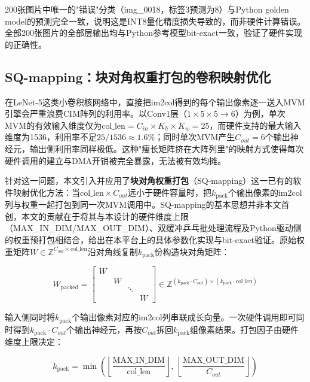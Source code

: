 \documentclass[12pt, a4paper]{article}
\begin{document}
200张图片中唯一的"错误"分类（img\_0018，标签3预测为8）与Python golden model的预测完全一致，说明这是INT8量化精度损失导致的，而非硬件计算错误。全部200张图片的全部层输出均与Python参考模型bit-exact一致，验证了硬件实现的正确性。


\subsection{SQ-mapping：块对角权重打包的卷积映射优化}
\label{sec:sqmapping}

在LeNet-5这类小卷积核网络中，直接把im2col得到的每个输出像素逐一送入MVM引擎会严重浪费CIM阵列的利用率。以Conv1层（$1\times5\times5\to6$）为例，单次MVM的有效输入维度仅为$\text{col\_len} = C_{in}\times K_h\times K_w = 25$，而硬件支持的最大输入维度为1536，利用率不足$25/1536\approx 1.6\%$；同时单次MVM产生$C_{out}=6$个输出神经元，输出侧利用率同样极低。这种"瘦长矩阵挤在大阵列里"的映射方式使得每次硬件调用的建立与DMA开销被完全暴露，无法被有效均摊。

针对这一问题，本文引入并应用了\textbf{块对角权重打包}（SQ-mapping）这一已有的软件映射优化方法：当$\text{col\_len}\times C_{out}$远小于硬件容量时，把$k_{\text{pack}}$个输出像素的im2col列与权重一起打包到同一次MVM调用中。SQ-mapping的基本思想并非本文首创，本文的贡献在于将其与本设计的硬件维度上限（MAX\_IN\_DIM/MAX\_OUT\_DIM）、双缓冲乒乓批处理流程及Python驱动侧的权重预打包相结合，给出在本平台上的具体参数化实现与bit-exact验证。原始权重矩阵$W\in\mathbb{Z}^{C_{out}\times \text{col\_len}}$沿对角线复制$k_{\text{pack}}$份构造块对角矩阵：

\begin{equation}
	W_{\text{packed}} = \begin{bmatrix}
		W & & & \\
		& W & & \\
		& & \ddots & \\
		& & & W
	\end{bmatrix} \in \mathbb{Z}^{(k_{\text{pack}}\cdot C_{out})\times (k_{\text{pack}}\cdot \text{col\_len})}
\end{equation}

输入侧同时将$k_{\text{pack}}$个输出像素对应的im2col列串联成长向量。一次硬件调用即可同时得到$k_{\text{pack}}\cdot C_{out}$个输出神经元，再按$C_{out}$拆回$k_{\text{pack}}$组像素结果。打包因子由硬件维度上限决定：

\begin{equation}
	k_{\text{pack}} = \min\!\left(\left\lfloor\frac{\text{MAX\_IN\_DIM}}{\text{col\_len}}\right\rfloor,\ \left\lfloor\frac{\text{MAX\_OUT\_DIM}}{C_{out}}\right\rfloor\right)
\end{equation}
\end{document}
